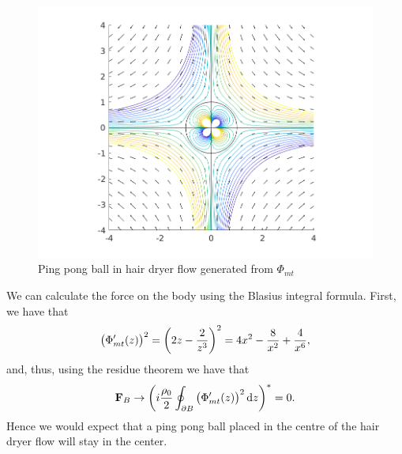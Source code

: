 \documentclass{article}
\def\*#1{\mathbf{#1}}
\begin{document}
\begin{figure}[ht]
    \includegraphics[width=35em]{mt_ex2_2}
    \centering
    \caption{Ping pong ball in hair dryer flow generated from $\Phi_{mt}$}
    \label{fig:mt-4}
\end{figure}
%
We can calculate the force on the body using the Blasius integral
formula. First, we have that
%
\begin{equation*}
    \del{\Phi_{mt}^\prime(z)}^2
        = \del{2 z - \frac{2}{z^3}}^2
        = 4 x^2 - \frac{8}{x^2} + \frac{4}{x^6}
        ,
\end{equation*}
%
and, thus, using the residue theorem we have that
%
\begin{equation*}
    \*F_B \to \del{i \frac{\rho_0}{2} \oint_{\partial B} \del{\Phi_{mt}^\prime(z)}^2 \dif z}^* = 0
    .
\end{equation*}
%
Hence we would expect that a ping pong ball placed in the centre of the
hair dryer flow will stay in the center.
\end{document}
